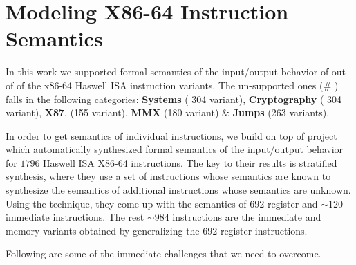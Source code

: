 
\section{Modeling X86-64 Instruction Semantics} \label{sec:modelI}

In this work we supported formal semantics of the input/output behavior of \supp{} out of \total{}  of the x86-64 Haswell ISA instruction variants.  The un-supported ones (\# \unsupp{}) falls in the following  categories: \textbf{Systems} ( 304 variant), \textbf{Cryptography} ( 304 variant), \textbf{X87}, (155 variant), \textbf{MMX} (180 variant) \& \textbf{Jumps} (263 variants). 



In order to get semantics of individual instructions, we build on top of project \Strata~\cite{Heule2016a} which automatically synthesized formal semantics  of the input/output behavior for $1796$ Haswell ISA X86-64 instructions. The key to their results is stratified synthesis, where they use a set of instructions whose semantics are known to synthesize the semantics of additional instructions whose semantics are unknown. Using the technique, they 
come up with the semantics of $692$ register and $\sim120$ immediate instructions. The rest $\sim984$ instructions are the immediate and memory variants obtained by generalizing the $692$ register instructions.     

Following are some of the immediate challenges that we need to overcome.

